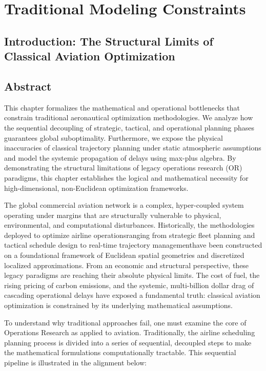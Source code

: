 \documentclass[11pt,a4paper]{book}
\begin{document}
\chapter{Traditional Modeling Constraints}
\section{Introduction: The Structural Limits of Classical Aviation Optimization}

\section*{Abstract}
This chapter formalizes the mathematical and operational bottlenecks that constrain traditional aeronautical optimization methodologies. We analyze how the sequential decoupling of strategic, tactical, and operational planning phases guarantees global suboptimality. Furthermore, we expose the physical inaccuracies of classical trajectory planning under static atmospheric assumptions and model the systemic propagation of delays using max-plus algebra. By demonstrating the structural limitations of legacy operations research (OR) paradigms, this chapter establishes the logical and mathematical necessity for high-dimensional, non-Euclidean optimization frameworks.


The global commercial aviation network is a complex, hyper-coupled system operating under margins that are structurally vulnerable to physical, environmental, and computational disturbances. Historically, the methodologies deployed to optimize airline operationsranging from strategic fleet planning and tactical schedule design to real-time trajectory managementhave been constructed on a foundational framework of Euclidean spatial geometries and discretized localized approximations. From an economic and structural perspective, these legacy paradigms are reaching their absolute physical limits. The cost of fuel, the rising pricing of carbon emissions, and the systemic, multi-billion dollar drag of cascading operational delays have exposed a fundamental truth: classical aviation optimization is constrained by its underlying mathematical assumptions.

To understand why traditional approaches fail, one must examine the core of Operations Research as applied to aviation. Traditionally, the airline scheduling planning process is divided into a series of sequential, decoupled steps to make the mathematical formulations computationally tractable. This sequential pipeline is illustrated in the alignment below:
\end{document}

